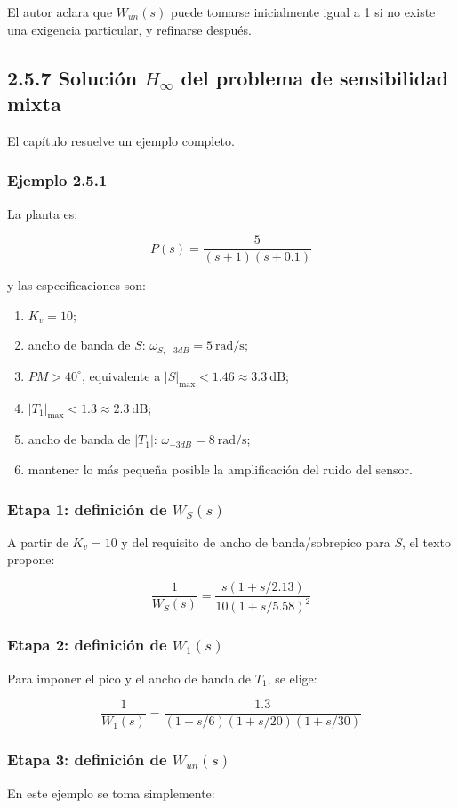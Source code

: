 El autor aclara que \(W_{un}(s)\) puede tomarse inicialmente igual a 1 si no existe una exigencia particular, y refinarse después.

\subsection{2.5.7 Solución \(H_\infty\) del problema de sensibilidad mixta}
El capítulo resuelve un ejemplo completo.

\subsubsection{Ejemplo 2.5.1}
La planta es:

$$
P(s)=\frac{5}{(s+1)(s+0.1)}
$$

y las especificaciones son:

\begin{enumerate}
  \item \(K_v=10\);
  \item ancho de banda de \(S\): \(\omega_{S,-3dB}=5\ \text{rad/s}\);
  \item \(PM>40^\circ\), equivalente a \(|S|_{\max}<1.46\approx 3.3\ \text{dB}\);
  \item \(|T_1|_{\max}<1.3\approx 2.3\ \text{dB}\);
  \item ancho de banda de \(|T_1|\): \(\omega_{-3dB}=8\ \text{rad/s}\);
  \item mantener lo más pequeña posible la amplificación del ruido del sensor.
\end{enumerate}

\subsubsection{Etapa 1: definición de \(W_S(s)\)}
A partir de \(K_v=10\) y del requisito de ancho de banda/sobrepico para \(S\), el texto propone:

$$
\frac{1}{W_S(s)}=
\frac{s(1+s/2.13)}{10(1+s/5.58)^2}
$$

\subsubsection{Etapa 2: definición de \(W_1(s)\)}
Para imponer el pico y el ancho de banda de \(T_1\), se elige:

$$
\frac{1}{W_1(s)}=
\frac{1.3}{(1+s/6)(1+s/20)(1+s/30)}
$$

\subsubsection{Etapa 3: definición de \(W_{un}(s)\)}
En este ejemplo se toma simplemente:

